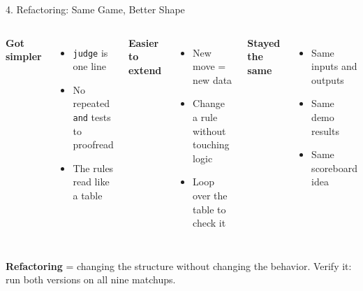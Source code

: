 \documentclass{beamer}
\begin{document}
\begin{frame}{4. Refactoring: Same Game, Better Shape}
\begin{columns}[T]
\textbf{Got simpler}
\begin{itemize}
    \item \texttt{judge} is one line
    \item No repeated \texttt{and} tests to proofread
    \item The rules read like a table
\end{itemize}
\textbf{Easier to extend}
\begin{itemize}
    \item New move = new data
    \item Change a rule without touching logic
    \item Loop over the table to check it
\end{itemize}
\textbf{Stayed the same}
\begin{itemize}
    \item Same inputs and outputs
    \item Same demo results
    \item Same scoreboard idea
\end{itemize}
\end{columns}
\vspace{1ex}
\textbf{Refactoring} = changing the structure without changing the behavior. Verify it: run both versions on all nine matchups.
\end{frame}
\end{document}
